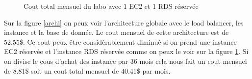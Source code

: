 \documentclass[french,a4paper,11pt]{article}
\begin{document}
    \begin{figure}
        \caption{\label{total-cost-reserved}Cout total mensuel du labo avec 1 EC2 et 1 RDS réservée}
    \end{figure}

    Sur la figure \ref{archi} on peux voir l'architecture globale avec le load balancer, les instance et la base de donnée.
    Le cout mensuel de cette architecture est de 52.55\$.
    Ce cout peux être considérablement diminué si on prend une instance EC2 réservée et l'instance RDS réservée comme on peux le voir sur la figure \ref{total-cost-reserved}.
    Si on divise le cous d'achat des instance par 36 mois cela nous fait un cout mensuel de 8.81\$ soit un cout total mensuel de 40.41\$ par mois.
\end{document}
